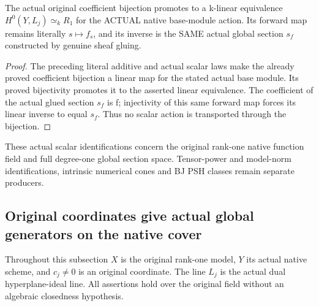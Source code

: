 \begin{theorem}
\label{thm:seven-native-actual-linear-full-H0}
\leanok
The actual original coefficient bijection promotes to a k-linear
equivalence $H^0(Y,L_j)\simeq_k R_1$ for the ACTUAL native base-module action.
Its forward map remains literally $s\mapsto f_s$, and its inverse is the
SAME actual global section $s_f$ constructed by genuine sheaf gluing.
\end{theorem}
\begin{proof}
The preceding literal additive and actual scalar laws make the already
proved coefficient bijection a linear map for the stated actual base
module. Its proved bijectivity promotes it to the asserted linear
equivalence. The coefficient of the actual glued section $s_f$ is f;
injectivity of this same forward map forces its linear inverse to equal
$s_f$. Thus no scalar action is transported through the bijection.
\end{proof}

\begin{remark}
These actual scalar identifications concern the original rank-one native
function field and full degree-one global section space. Tensor-power and
model-norm identifications, intrinsic numerical cones and BJ PSH classes
remain separate producers.
\end{remark}

\subsection{Original coordinates give actual global generators on the native cover}
Throughout this subsection $X$ is the original rank-one model, $Y$ its actual
native scheme, and $c_j\ne0$ is an original coordinate. The line $L_j$ is the
actual dual hyperplane-ideal line. All assertions hold over the original
field without an algebraic closedness hypothesis.

